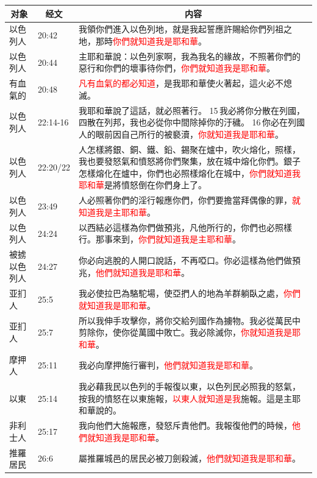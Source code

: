 \begin{table}[H]
\centering
\begin{tabular}{p{1.5cm}|p{}|p{13.0cm}}\hline\hline
\multicolumn{1}{c|}{对象}&\multicolumn{1}{c|}{经文}&\multicolumn{1}{c}{内容}\\\hline

以色列人&20:42&我領你們進入以色列地，就是我起誓應許賜給你們列祖之地，那時\textcolor{red}{你們就知道我是耶和華}。\\\hline


以色列人&20:44&主耶和華說：以色列家啊，我為我名的緣故，不照著你們的惡行和你們的壞事待你們，\textcolor{red}{你們就知道我是耶和華}。\\\hline

有血氣的&20:48&\textcolor{red}{凡有血氣的都必知道}，是我耶和華使火著起，這火必不熄滅。\\\hline
以色列人&22:14-16&我耶和華說了這話，就必照著行。 15 我必將你分散在列國，四散在列邦，我也必從你中間除掉你的汙穢。 16 你必在列國人的眼前因自己所行的被褻瀆，\textcolor{red}{你就知道我是耶和華}。\\\hline

以色列人&22:20/22&人怎樣將銀、銅、鐵、鉛、錫聚在爐中，吹火熔化，照樣，我也要發怒氣和憤怒將你們聚集，放在城中熔化你們。銀子怎樣熔化在爐中，你們也必照樣熔化在城中，\textcolor{red}{你們就知道我耶和華}是將憤怒倒在你們身上了。\\\hline
以色列人& 23:49&人必照著你們的淫行報應你們，你們要擔當拜偶像的罪，\textcolor{red}{就知道我是主耶和華}。\\\hline

以色列人&24:24&以西結必這樣為你們做預兆，凡他所行的，你們也必照樣行。那事來到，\textcolor{red}{你們就知道我是主耶和華}。\\\hline

被掳以色列人&24:27&你必向逃脫的人開口說話，不再啞口。你必這樣為他們做預兆，\textcolor{red}{他們就知道我是耶和華}。\\\hline

亚扪人&25:5&我必使拉巴為駱駝場，使亞捫人的地為羊群躺臥之處，\textcolor{red}{你們就知道我是耶和華}。\\\hline
亚扪人&25:7&所以我伸手攻擊你，將你交給列國作為擄物。我必從萬民中剪除你，使你從萬國中敗亡。我必除滅你，\textcolor{red}{你就知道我是耶和華}。\\\hline

摩押人&25:11&我必向摩押施行審判，\textcolor{red}{他們就知道我是耶和華}。\\\hline
以東&25:14&我必藉我民以色列的手報復以東，以色列民必照我的怒氣，按我的憤怒在以東施報，\textcolor{red}{以東人就知道是我}施報。這是主耶和華說的。\\\hline
非利士人&25:17&我向他們大施報應，發怒斥責他們。我報復他們的時候，\textcolor{red}{他們就知道我是耶和華}。\\\hline
推羅居民&26:6&屬推羅城邑的居民必被刀劍殺滅，\textcolor{red}{他們就知道我是耶和華}。\\\hline


\end{tabular}
\end{table}

